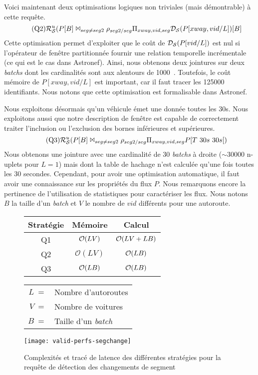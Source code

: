 Voici maintenant deux optimisations logiques non triviales (mais démontrable) à cette requête.
\begin{equation}
  \tag{Q2}
\mathcal{R}_{\mathcal S}^{u}(P[B] \Join_{seg\neq seg2} \rho_{seg2/seg} \Pi_{xway,vid,seg} \mathcal{D_S}(P[xway,vid/L])[B]
\end{equation}
Cette optimisation permet d'exploiter que le coût de $\mathcal{D_S}(P[vid/L])$ est nul si l'opérateur de fenêtre partitionnée fournir une relation temporelle incrémentale (ce qui est le cas dans Astronef). Ainsi, nous obtenons deux jointures sur deux \textit{batchs} dont les cardinalités sont aux alentours de 1000~\cite{Jain:lrb}. Toutefois, le coût mémoire de $P[xway,vid/L]$ est important, car il faut tracer les 125000 identifiants. Nous notons que cette optimisation est formalisable dans Astronef.

Nous exploitons désormais qu'un véhicule émet une donnée toutes les 30s. Nous exploitons aussi que notre description de fenêtre est capable de correctement traiter l'inclusion ou l'exclusion des bornes inférieures et supérieures. 
\begin{equation}
  \tag{Q3}
\RSu(P[B] \Join_{seg\neq seg2} \rho_{seg2/seg} \Pi_{xway,vid,seg} P[T\ 30s\ 30s[)
\end{equation}
Nous obtenons une jointure avec une cardinalité de 30 \textit{batchs} à droite ($\sim$30000 n-uplets pour $L=1$) mais dont la table de hachage n'est calculée qu'une fois toutes les 30 secondes. Cependant, pour avoir une optimisation automatique, il faut avoir une connaissance sur les propriétés du flux $P$. Nous remarquons encore la pertinence de l'utilisation de statistiques pour caractériser les flux. Nous notons $B$ la taille d'un \textit{batch} et $V$ le nombre de $vid$ différents pour une autoroute.

\begin{figure}[ht]
\centering
\begin{minipage}{0.44\textwidth}
\centering
\begin{tabular}{|c|c|c|}\bottomrule
\rowcolor{hypcolor} Stratégie & Mémoire & Calcul \\ \hline
Q1 & $\mathcal{O}(LV)$ & $\mathcal{O}(LV+LB)$ \\\hline
Q2 & $\mathcal O(LV)$ & $\mathcal{O}(LB)$  \\\hline
Q3 & $\mathcal{O}(LB)$ & $\mathcal{O}(LB)$\\ \toprule
\end{tabular}

\centering
\begin{tabular}{rl}
$L\ =$ & Nombre d'autoroutes\\
$V\ =$ & Nombre de voitures\\
$B\ =$ & Taille d'un \textit{batch}
\end{tabular}
\end{minipage}
\begin{minipage}{0.55\textwidth}
\texttt{[image: valid-perfs-segchange]}
\end{minipage}
\caption{Complexités et tracé de latence des différentes stratégies pour la requête de détection des changements de segment}\label{fig:valid:perfs:segchange}
\end{figure}

